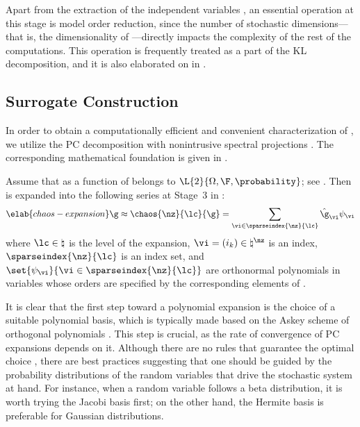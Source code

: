 Apart from the extraction of the independent variables \vz, an essential
operation at this stage is model order reduction, since the number of stochastic
dimensions---that is, the dimensionality of \vz---directly impacts the
complexity of the rest of the computations. This operation is frequently treated
as a part of the \ac{KL} decomposition, and it is also elaborated on in
.

\subsection{Surrogate Construction}

In order to obtain a computationally efficient and convenient characterization
of \g, we utilize the \ac{PC} decomposition with nonintrusive spectral
projections \cite{xiu2010}. The corresponding mathematical foundation is given
in .

Assume that \g as a function of \vz belongs to $\L{2}{\Omega, \F,
\probability}$; see . Then \g is expanded into the
following series at Stage~3 in :
\begin{equation} \elab{chaos-expansion}
  \g \approx \chaos{\nz}{\lc}{\g}
  = \sum_{\vi \in \sparseindex{\nz}{\lc}} \hat{\g}_{\vi} \psi_{\vi}
\end{equation}
where $\lc \in \natural$ is the level of the expansion, $\vi = (i_k) \in
\natural^\nz$ is an index, $\sparseindex{\nz}{\lc}$ is an index set, and
$\set{\psi_{\vi}}{\vi \in \sparseindex{\nz}{\lc}}$ are orthonormal polynomials
in \nz variables whose orders are specified by the corresponding elements of
\vi.

It is clear that the first step toward a polynomial expansion is the choice of a
suitable polynomial basis, which is typically made based on the Askey scheme of
orthogonal polynomials \cite{xiu2010}. This step is crucial, as the rate of
convergence of \ac{PC} expansions depends on it. Although there are no rules
that guarantee the optimal choice \cite{knio2006}, there are best practices
suggesting that one should be guided by the probability distributions of the
random variables that drive the stochastic system at hand. For instance, when a
random variable follows a beta distribution, it is worth trying the Jacobi basis
first; on the other hand, the Hermite basis is preferable for Gaussian
distributions.

